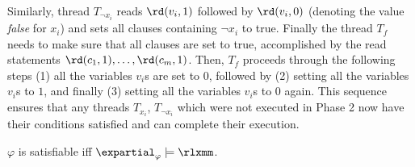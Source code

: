 Similarly, thread $T_{\neg x_i}$ reads $\rd(v_i, 1)$ followed by $\rd(v_i, 0)$ (denoting the value \emph{false} for $x_i$) and sets all clauses containing $\neg x_i$ to true. 
Finally the thread $T_{f}$ needs to make sure that all clauses are set to true, accomplished by the read statements $\rd(c_1, 1), \dots, \rd(c_m, 1)$.
Then, $T_{f}$ proceeds through the following steps (1) all the variables $v_i$s are set to $0$, followed by (2) setting all the variables $v_i$s to $1$, and finally (3) setting all the variables $v_i$s to $0$ again.
This sequence ensures that any threads $T_{x_i}$, $T_{\neg x_i}$ which were not executed in Phase 2 now have their conditions satisfied and can complete their execution. 




\begin{lemma}
    $\varphi$ is satisfiable iff $\expartial_\varphi  \models \rlxmm$.
\end{lemma}

